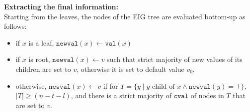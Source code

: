 \textbf{Extracting the final information:}\\
Starting from the leaves, the nodes of the EIG tree are evaluated bottom-up as follows:
\begin{itemize}
    \item if $x$ is a leaf, $\mathtt{newval}(x) \leftarrow \mathtt{val}(x)$
    \item if $x$ is root, $\mathtt{newval}(x) \leftarrow v$ such that strict majority of new values of its children are set to $v$, otherwise it is set to default value $v_0$.
    \item otherwise, $\mathtt{newval}(x) \leftarrow v$ if for $T = \{y \mid y \text{ child of } x \wedge \mathtt{newval}(y) = \top\}$, $\mid T \mid \geq (n-t-l)$, and there is a strict majority of $\mathtt{cval}$ of nodes in $T$ that are set to $v$.
\end{itemize}


